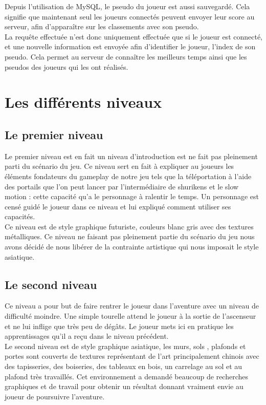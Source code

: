 \documentclass[12pt]{article}
\begin{document}
Depuis l'utilisation de MySQL, le pseudo du joueur est aussi sauvegardé. Cela signifie que maintenant seul les joueurs connectés peuvent envoyer leur score au serveur, afin d'apparaître sur les classements avec son pseudo.\\
La requête effectuée n'est donc uniquement effectuée que si le joueur est connecté, et une nouvelle information est envoyée afin d'identifier le joueur, l'index de son pseudo.
Cela permet au serveur de connaître les meilleurs temps ainsi que les pseudos des joueurs qui les ont réalisés.

\section{Les différents niveaux}

\subsection{Le premier niveau}

Le premier niveau est en fait un niveau d'introduction est ne fait pas pleinement parti du scénario du jeu. Ce niveau sert en fait à expliquer au joueurs les éléments fondateurs du gameplay de notre jeu tels que la téléportation à l'aide des portails que l'on peut lancer par l'intermédiaire de  shurikens et le slow motion : cette capacité qu'a le personnage à ralentir le temps. Un personnage est censé guidé le joueur dans ce niveau et lui expliqué comment utiliser ses capacités.\\
Ce niveau est de style graphique futuriste, couleurs blanc gris avec des textures métalliques. Ce niveau ne faisant pas pleinement partie du scénario du jeu nous avons décidé de nous libérer de la contrainte artistique qui nous imposait le style asiatique.

\subsection{Le second niveau}

Ce niveau a pour but de faire rentrer le joueur dans l'aventure avec un niveau de difficulté moindre. Une simple tourelle attend le joueur à la sortie de l'ascenseur et ne lui inflige que très peu de dégâts. Le joueur mets ici en pratique les apprentissages qu'il a reçu dans le niveau précédent.\\
Le second niveau est de style graphique asiatique, les murs, sols , plafonds et portes sont couverts de textures représentant de l'art principalement chinois avec des tapisseries, des boiseries, des tableaux en bois, un carrelage au sol et au plafond très travaillés. Cet environnement a demandé beaucoup de recherches graphiques et de travail pour obtenir un résultat donnant vraiment envie au joueur de poursuivre l'aventure.
\end{document}
